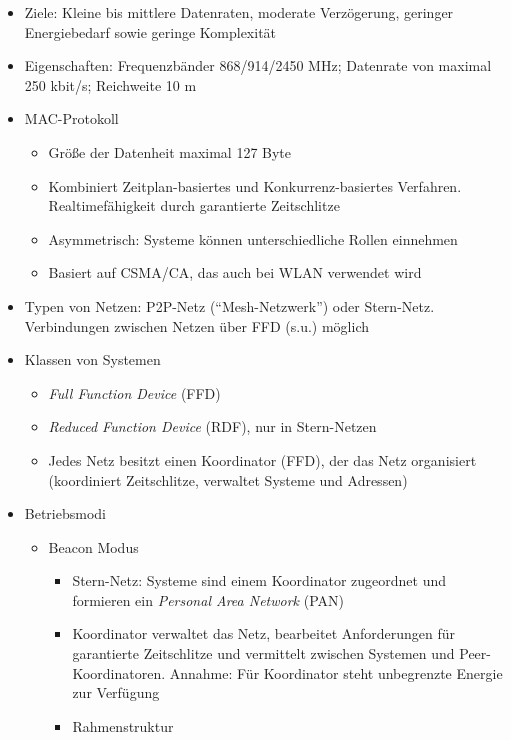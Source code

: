 \begin{itemize}
\begin{itemize}
		\item Ziele: Kleine bis mittlere Datenraten, moderate Verzögerung, geringer Energiebedarf sowie geringe Komplexität
		\item Eigenschaften: Frequenzbänder 868/914/2450 MHz; Datenrate von maximal 250 kbit/s; Reichweite 10 m
		\item MAC-Protokoll
		\begin{itemize}
			\item Größe der Datenheit maximal 127 Byte
			\item Kombiniert Zeitplan-basiertes und Konkurrenz-basiertes Verfahren. Realtimefähigkeit durch garantierte Zeitschlitze
			\item Asymmetrisch: Systeme können unterschiedliche Rollen einnehmen
			\item Basiert auf CSMA/CA, das auch bei WLAN verwendet wird
		\end{itemize}
		\item Typen von Netzen: P2P-Netz ("`Mesh-Netzwerk"') oder Stern-Netz. Verbindungen zwischen Netzen über FFD (s.u.) möglich
		\item Klassen von Systemen
		\begin{itemize}
			\item \textit{Full Function Device} (FFD)
			\item \textit{Reduced Function Device} (RDF), nur in Stern-Netzen
			\item Jedes Netz besitzt einen Koordinator (FFD), der das Netz organisiert (koordiniert Zeitschlitze, verwaltet Systeme und Adressen)
		\end{itemize}
		\item Betriebsmodi
		\begin{itemize}
			\item Beacon Modus
			\begin{itemize}
				\item Stern-Netz: Systeme sind einem Koordinator zugeordnet und formieren ein \textit{Personal Area Network} (PAN)
				\item Koordinator verwaltet das Netz, bearbeitet Anforderungen für garantierte Zeitschlitze und vermittelt zwischen Systemen und Peer-Koordinatoren. Annahme: Für Koordinator steht unbegrenzte Energie zur Verfügung
				\item Rahmenstruktur
\end{itemize}
\end{itemize}
\end{itemize}
\end{itemize}
